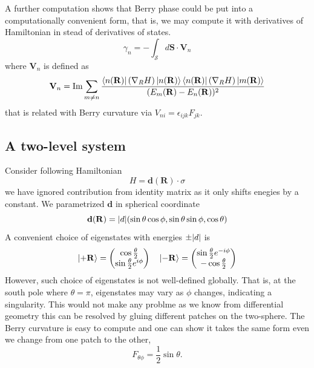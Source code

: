 \documentclass[12pt,a4paper]{article}
\numberwithin{equation}{section}
\begin{document}
A further computation shows that Berry phase could be put into a computationally convenient form, that is, we may compute it with derivatives of Hamiltonian in stead of derivatives of states.
\begin{equation}
    \gamma_n = -\int_{\mathcal{S}}d\mathbf{S}\cdot \mathbf{V}_n
\end{equation}
where $\mathbf{V}_n$ is defined as 
\begin{equation}
    \mathbf{V}_n = \operatorname{Im}\sum_{m\neq n}\frac{\bra{n(\mathbf{R})}(\nabla_R H)\ket{n(\mathbf{R})} \bra{n(\mathbf{R})}(\nabla_R H)\ket{m(\mathbf{R})}}{(E_m(\mathbf{R})-E_n(\mathbf{R}))^2}
\end{equation}
that is related with Berry curvature via $V_{ni} = \epsilon_{ijk}F_{jk}$.

\subsection*{A two-level system}
Consider following Hamiltonian
\begin{equation}
    H = \mathbf{d}(\mathbf{R})\cdot \sigma
\end{equation}
we have ignored contribution from identity matrix as it only shifts enegies by a constant.
We parametrized $\mathbf{d}$ in spherical coordinate 
\begin{equation}
    \mathbf{d}(\mathbf{R}) = \abs{d}(\sin\theta\cos\phi,\sin\theta\sin\phi,\cos\theta)
\end{equation}
A convenient choice of eigenstates with energies $\pm\abs{d}$ is 
\begin{equation}
    \ket{+\mathbf{R}} = 
    \begin{pmatrix}
        \cos\frac{\theta}{2}\\
        \sin\frac{\theta}{2}e^{i\phi}
    \end{pmatrix}
    \quad
    \ket{-\mathbf{R}} = 
    \begin{pmatrix}
        \sin\frac{\theta}{2}e^{-i\phi}\\
        -\cos\frac{\theta}{2}
    \end{pmatrix}
\end{equation}
However, such choice of eigenstates is not well-defined globally. That is, at the south pole where $\theta = \pi$, eigenstates
may vary as $\phi$ changes, indicating a singularity. This would not make any problme as we know from differential geometry this can
be resolved by gluing different patches on the two-sphere. The Berry curvature is easy to compute and one can show it takes the same form 
even we change from one patch to the other,
\begin{equation}
    F_{\theta\phi} = \frac{1}{2}\sin\theta.
\end{equation}
\end{document}

